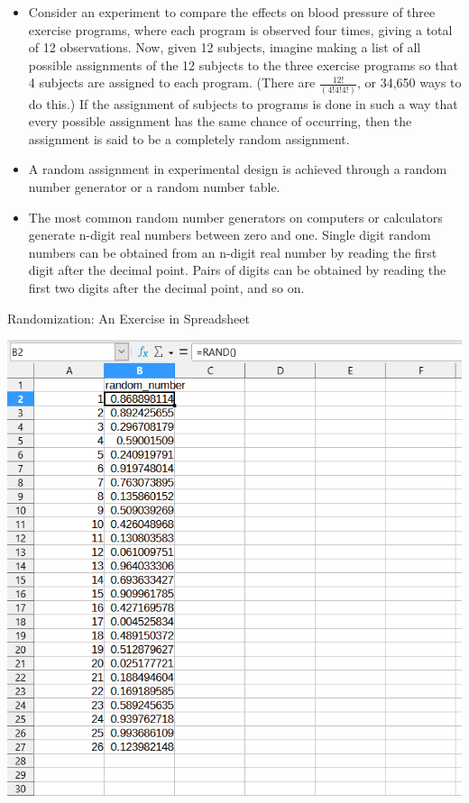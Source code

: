 \documentclass[
  ignorenonframetext,
  aspectratio=169]{beamer}
\providecommand{\tightlist}{%
  \setlength{\itemsep}{0pt}\setlength{\parskip}{0pt}}
\begin{document}
\begin{frame}{}
\protect\hypertarget{section-4}{}
\begin{itemize}[<+->]
\tightlist
\item
  Consider an experiment to compare the effects on blood pressure of
  three exercise programs, where each program is observed four times,
  giving a total of 12 observations. Now, given 12 subjects, imagine
  making a list of all possible assignments of the 12 subjects to the
  three exercise programs so that 4 subjects are assigned to each
  program. (There are \(\frac{12!}{(4!4!4!)}\), or 34,650 ways to do
  this.) If the assignment of subjects to programs is done in such a way
  that every possible assignment has the same chance of occurring, then
  the assignment is said to be a completely random assignment.
\item
  A random assignment in experimental design is achieved through a
  random number generator or a random number table.
\end{itemize}

\begin{itemize}[<+->]
\tightlist
\item
  The most common random number generators on computers or calculators
  generate n-digit real numbers between zero and one. Single digit
  random numbers can be obtained from an n-digit real number by reading
  the first digit after the decimal point. Pairs of digits can be
  obtained by reading the first two digits after the decimal point, and
  so on.
\end{itemize}
\end{frame}

\begin{frame}{Randomization: An Exercise in Spreadsheet}
\protect\hypertarget{randomization-an-exercise-in-spreadsheet}{}
\begin{center}\includegraphics[width=0.45\linewidth]{./images/random_number_generation_spreadsheet} \end{center}
\end{frame}
\end{document}
